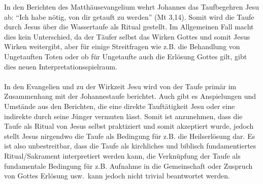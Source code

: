 In den Berichten des Matthäusevangelium wehrt Johannes das Taufbegehren Jesu ab: ``Ich habe nötig, von dir getauft zu werden'' (Mt 3,14). Somit wird die Taufe durch Jesus über die Wassertaufe als Ritual gestellt. Im Allgemeinen Fall macht dies kein Unterschied, da der Täufer selbst das Wirken Gottes und somit Jesus Wirken weitergibt, aber für einige Streitfragen wie z.B. die Behandlung von Ungetauften Toten oder ob für Ungetaufte auch die Erlösung Gottes gilt, gibt dies neuen Interpretationsspielraum.
\\~\\
In den Evangelien und zu der Wirkzeit Jesu wird von der Taufe primär im Zusammenhang mit der Johannestaufe berichtet. Auch gibt es Anspielungen und Umstände aus den Berichten, die eine direkte Tauftätigkeit Jesu oder eine indirekte durch seine Jünger vermuten lässt. Somit ist anzunehmen, dass die Taufe als Ritual von Jesus selbst praktiziert und somit akzeptiert wurde, jedoch stellt Jesus nirgendwo die Taufe als Bedingung für z.B. die Heilserlösung dar. Es ist also unbestreitbar, dass die Taufe als kirchliches und biblisch fundamentiertes Ritual/Sakrament interpretiert werden kann, die Verknüpfung der Taufe als fundamentale Bedingung für z.B. Aufnahme in die Gemeinschaft oder Zuspruch von Gottes Erlösung usw.\ kann jedoch nicht trivial beantwortet werden.

